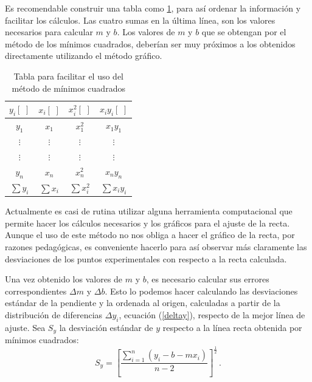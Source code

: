 Es recomendable construir una tabla como \ref{tablamincua}, para as\'i ordenar la informaci\'on y facilitar los c\'alculos. Las cuatro sumas en la \'ultima l\'inea, son los valores necesarios para calcular $m$ y $b$. Los valores de $m$ y $b$ que se obtengan por el m\'etodo de los m\'inimos cuadrados, deber\'ian ser muy pr\'oximos a los obtenidos directamente utilizando el m\'etodo gr\'afico.
\begin{table}[h]
\begin{center}
\begin{tabular}{|c|c|c|c|}
\hline $y_i [\,\,]$ & $x_i [\,\,]$ & $x_i^2 [\,\,]$& $x_i y_i [\,\,]$ \\
\hline \hline $y_1$ & $x_1$ & $x_1^2$ & $x_1 y_1$ \\
\hline $\vdots$ & $\vdots$ & $\vdots$ & $\vdots$ \\
\hline $\vdots$ & $\vdots$ & $\vdots$ & $\vdots$ \\
\hline $y_n$ & $x_n$ & $x_n^2$ & $x_n y_n$ \\ \hline
\hline $\sum y_i$ &$\sum x_i $& $\sum x_i^2$ & $\sum x_i y_i$ \\
\hline
\end{tabular}
\end{center}
\caption{Tabla para facilitar el uso del  m\'etodo de m\'inimos cuadrados}
\label{tablamincua}
\end{table}


Actualmente es casi de rutina utilizar alguna herramienta computacional  que permite hacer los c\'alculos necesarios y los gr\'aficos para el ajuste de la recta. Aunque el uso de este m\'etodo no nos obliga a hacer el gr\'afico de la recta, por razones pedag\'ogicas, es conveniente hacerlo para as\'i observar m\'as claramente las desviaciones de los puntos experimentales con respecto a la recta calculada. 

Una vez obtenido los valores de $m$ y ${b}$, es necesario calcular sus errores correspondientes $\Delta m$ y $\Delta b$. Esto lo podemos hacer calculando las desviaciones est\'andar  de la pendiente y la ordenada al origen, calculadas a partir de la distribuci\'on de diferencias $\Delta y_i$, ecuaci\'on (\ref{deltay}),  respecto de la mejor l\'inea de ajuste. Sea  $S_y$  la  desviaci\'on est\'andar de $y$ respecto a la l\'inea recta obtenida por m\'inimos cuadrados:
\begin{equation}
S_y=\left[\frac{\sum\limits_{i=1}^n \left(y_i-b-m x_i\right)}{n-2}\right]^{\frac{1}{2}} \,.
\end{equation}

